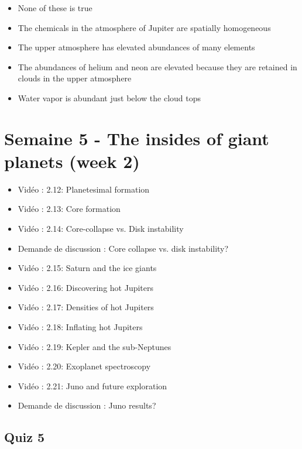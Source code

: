 \begin{multicols}{2}
\begin{itemize}[label={$\bullet$}]
    \item None of these is true
    \item The chemicals in the atmosphere of Jupiter are spatially homogeneous 
    \item The upper atmosphere has elevated abundances of many elements
    \item The abundances of helium and neon are elevated because they are retained in clouds in the upper atmosphere 
    \item Water vapor is abundant just below the cloud tops
\end{itemize}
\end{multicols}

\newpage 

\section*{Semaine 5 - The insides of giant planets (week 2)}


\begin{itemize}[label={$\bullet$}]
    \item Vidéo : 2.12: Planetesimal formation
    \item Vidéo : 2.13: Core formation
    \item Vidéo : 2.14: Core-collapse vs. Disk instability
    \item Demande de discussion : Core collapse vs. disk instability?
    \item Vidéo : 2.15: Saturn and the ice giants
    \item Vidéo : 2.16: Discovering hot Jupiters
    \item Vidéo : 2.17: Densities of hot Jupiters
    \item Vidéo : 2.18: Inflating hot Jupiters
    \item Vidéo : 2.19: Kepler and the sub-Neptunes
    \item Vidéo : 2.20: Exoplanet spectroscopy
    \item Vidéo : 2.21: Juno and future exploration
    \item Demande de discussion : Juno results?
\end{itemize}

\newpage 

\subsection*{Quiz 5}

